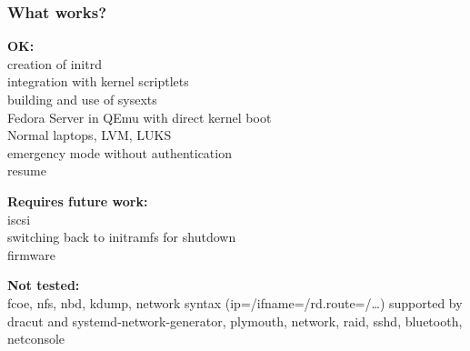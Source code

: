 \documentclass[]{beamer}
\begin{document}







\begin{frame}
  \frametitle{What works?}

  \textbf{OK:}\\
  creation of initrd\\
  integration with kernel scriptlets\\
  building and use of sysexts\\
  Fedora Server in QEmu with direct kernel boot\\
  Normal laptops, LVM, LUKS\\
  emergency mode without authentication\\
  resume

  \bigskip

  \textbf{Requires future work:}\\
  iscsi\\
  switching back to initramfs for shutdown\\
  firmware

  \bigskip

  \textbf{Not tested:}\\
  fcoe,
  nfs,
  nbd,
  kdump,
  network syntax (ip=/ifname=/rd.route=/…) supported by dracut and systemd-network-generator,
  plymouth,
  network,
  raid,
  sshd,
  bluetooth,
  netconsole
\end{frame}
\end{document}
